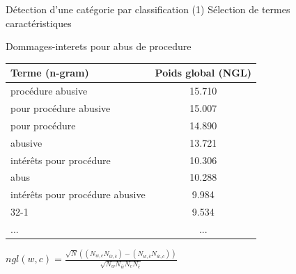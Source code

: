 \documentclass[newPxFont,pagenumber]{beamer}
\begin{document}

\begin{frame}{Détection d'une catégorie par classification}
(1) Sélection de termes caractéristiques
\begin{exampleblock}{Dommages-interets pour abus de procedure}
\small
\begin{tabular}{l|c}
\textbf{Terme (n-gram)} & \textbf{Poids global (NGL)}  \\ \hline
\midrule
procédure abusive & 15.710 \\ \hline
pour procédure abusive & 15.007 \\ \hline
pour procédure & 14.890 \\ \hline
abusive & 13.721 \\ \hline
intérêts pour procédure & 10.306 \\ \hline
abus & 10.288 \\ \hline
intérêts pour procédure abusive & 9.984 \\ \hline
32-1 & 9.534\\ \hline
... & ...
\end{tabular}
\end{exampleblock}
$ngl(w,c) = \frac{\sqrt{N} ((N_{w,c} N_{\overline{w},\overline{c}}) - (N_{w,\overline{c}} N_{\overline{w},c}))}{\sqrt{N_w N_{\overline{w}} N_c N_{\overline{c}}}}$ \cite{ng1997ngl}
\end{frame}

\end{document}
